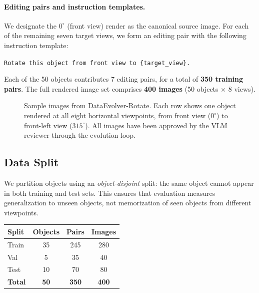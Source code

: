 \paragraph{Editing pairs and instruction templates.}
We designate the $0^\circ$ (front view) render as the canonical source image.
For each of the remaining seven target views,
we form an editing pair with the following instruction template:

\begin{center}
\texttt{Rotate this object from front view to \{target\_view\}.}
\end{center}

Each of the 50 objects contributes 7 editing pairs,
for a total of \textbf{350 training pairs}.
The full rendered image set comprises \textbf{400 images} (50 objects $\times$ 8 views).

\begin{figure}[t]
  \centering
  \caption{
    Sample images from DataEvolver-Rotate.
    Each row shows one object rendered at all eight horizontal viewpoints,
    from front view ($0^\circ$) to front-left view ($315^\circ$).
    All images have been approved by the VLM reviewer through the evolution loop.
  }
  \label{fig:dataset_grid}
\end{figure}

\subsection{Data Split}
\label{sec:dataset:split}

We partition objects using an \emph{object-disjoint} split:
the same object cannot appear in both training and test sets.
This ensures that evaluation measures generalization to unseen objects,
not memorization of seen objects from different viewpoints.

\begin{center}
\begin{tabular}{lccc}
\toprule
Split & Objects & Pairs & Images \\
\midrule
Train & 35 & 245 & 280 \\
Val   & 5  & 35  & 40  \\
Test  & 10 & 70  & 80  \\
\midrule
\textbf{Total} & \textbf{50} & \textbf{350} & \textbf{400} \\
\bottomrule
\end{tabular}
\end{center}

